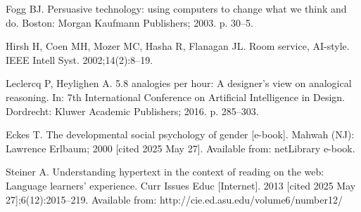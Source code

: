 \documentclass{siintec}
\begin{document}
\begin{thebibliography}{99}

Fogg BJ. Persuasive technology: using computers to change what we think and do. Boston: Morgan Kaufmann Publishers; 2003. p. 30–5.

Hirsh H, Coen MH, Mozer MC, Hasha R, Flanagan JL. Room service, AI-style. IEEE Intell Syst. 2002;14(2):8–19.

Leclercq P, Heylighen A. 5.8 analogies per hour: A designer's view on analogical reasoning. In: 7th International Conference on Artificial Intelligence in Design. Dordrecht: Kluwer Academic Publishers; 2016. p. 285–303.

Eckes T. The developmental social psychology of gender [e-book]. Mahwah (NJ): Lawrence Erlbaum; 2000 [cited 2025 May 27]. Available from: netLibrary e-book.

Steiner A. Understanding hypertext in the context of reading on the web: Language learners' experience. Curr Issues Educ [Internet]. 2013 [cited 2025 May 27];6(12):2015–219. Available from: http://cie.ed.asu.edu/volume6/number12/

\end{thebibliography}
\end{document}
